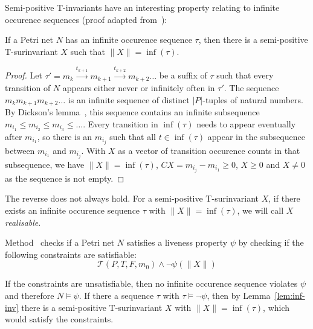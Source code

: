 Semi-positive T-invariants have an interesting property relating to infinite
occurence sequences (proof adapted from~\cite{EsparzaBruns96}):
\begin{lemma}
\label{lem:inf-inv}
    If a Petri net $N$ has an infinite occurence sequence $\tau$, then
    there is a semi-positive T-surinvariant $X$ such that
    $\|X\| = \inf(\tau)$.
\end{lemma}
\begin{proof}
    Let $\tau' = m_k \xrightarrow{t_{k+1}} m_{k+1} \xrightarrow{t_{k+2}} m_{k+2} \ldots$ be
    a suffix of $\tau$ such that every transition of $N$ appears either
    never or infinitely often in $\tau'$. The sequence $m_k m_{k+1} m_{k+2} \ldots$
    is an infinite sequence of distinct $|P|$-tuples of natural numbers.
    By Dickson's lemma~\cite{Dickson13}, this sequence contains an
    infinite subsequence $m_{i_1} \le m_{i_2} \le m_{i_3} \le \ldots$.
    Every transition in $\inf(\tau)$ needs to appear eventually after
    $m_{i_1}$, so there is an $m_{i_j}$ such that all $t \in \inf(\tau)$
    appear in the subsequence between $m_{i_1}$ and $m_{i_j}$. With
    $X$ as a vector of transition occurence counts in that subsequence,
    we have $\|X\| = \inf(\tau)$, $C X = m_{i_j} - m_{i_1} \ge 0$,
    $X \ge 0$ and $X \ne 0$ as the sequence is not empty.
\end{proof}
The reverse does not always hold. For a semi-positive T-surinvariant $X$,
if there exists an infinite occurence sequence $\tau$ with $\|X\| = \inf(\tau)$,
we will call $X$ \emph{realisable}.

Method \liveness\ checks if a Petri net $N$ satisfies a liveness
property $\psi$ by checking if the following constraints are satisfiable:
\begin{equation}\label{eq:liveness}
  \mathcal{T}(P, T, F, m_0) \land \neg\psi(\|X\|)
\end{equation}

If the constraints are unsatisfiable, then no infinite occurence
sequence violates $\psi$ and therefore $N \models \psi$.
If there a sequence $\tau$ with $\tau \models \neg\psi$,
then by Lemma~\ref{lem:inf-inv} there is a semi-positive T-surinvariant
$X$ with $\|X\| = \inf(\tau)$, which would satisfy the constraints.


